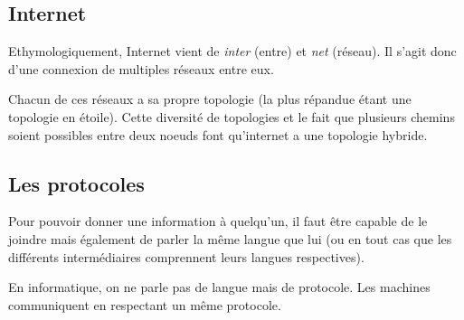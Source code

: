 
\subsection{Internet}

Ethymologiquement, Internet vient de \textit{inter} (entre) et \textit{net} (réseau). Il s'agit donc d'une connexion de multiples réseaux entre eux.





Chacun de ces réseaux a sa propre topologie (la plus répandue étant une topologie en étoile). Cette diversité de topologies et le fait que plusieurs chemins soient possibles entre deux noeuds font qu'internet a une topologie hybride.


\subsection{Les protocoles}
Pour pouvoir donner une information à quelqu'un, il faut être capable de le joindre mais également de parler la même langue que lui (ou en tout cas que les différents intermédiaires comprennent leurs langues respectives).

En informatique, on ne parle pas de langue mais de protocole. Les machines communiquent en respectant un même protocole.

